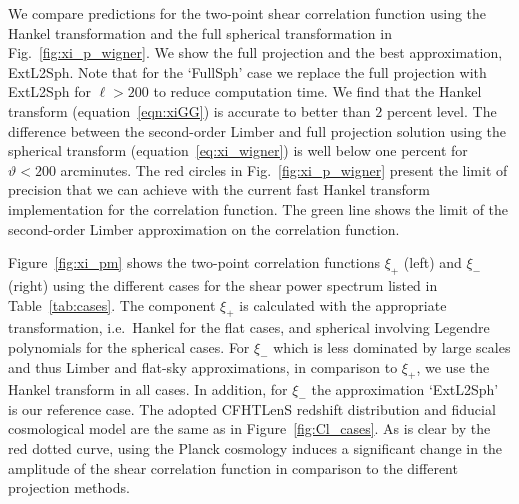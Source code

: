 \documentclass[fleqn,usenatbib]{mnras} %
\begin{document}
We compare predictions for the two-point shear correlation function using
the Hankel transformation and the full spherical transformation in
Fig.~\ref{fig:xi_p_wigner}. We show the full projection and the best
approximation, ExtL2Sph. Note that for the `FullSph' case we replace the full
projection with ExtL2Sph for $\ell > 200$ to reduce computation time.
%
We find that the Hankel transform (equation~\ref{eqn:xiGG}) is accurate to better than $2$ percent level.
%
The difference between the second-order Limber and full projection solution using the
spherical transform (equation~\ref{eq:xi_wigner}) is well below one percent
for $\vartheta < 200$ arcminutes.
The red circles in Fig.~\ref{fig:xi_p_wigner} present the limit of
precision that we can achieve with the current fast Hankel transform implementation
for the correlation function. The green line shows the limit of the
second-order Limber approximation on the correlation function.

Figure~\ref{fig:xi_pm} shows the two-point correlation functions $\xi_+$ (left)
and $\xi_-$ (right) using the different cases for the shear power spectrum
listed in Table~\ref{tab:cases}. The component $\xi_+$ is calculated with the
appropriate transformation, i.e.~Hankel for the flat cases, and {spherical
involving Legendre polynomials} for the spherical cases. For $\xi_-$ which is
less dominated by large scales and thus Limber and flat-sky approximations, in
comparison to $\xi_+$, we use the Hankel transform in all cases. In addition,
for $\xi_-$ the approximation `ExtL2Sph' is our reference case. The adopted
CFHTLenS redshift distribution and fiducial cosmological model are the same as
in Figure~\ref{fig:Cl_cases}. As is clear by the red dotted curve, using the
Planck cosmology \citep{2015arXiv150201589P} induces a significant change in
the amplitude of the shear correlation function in comparison to the different
projection methods.
\end{document}
